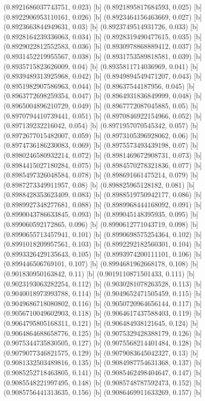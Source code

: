 {{{(0.8921686037743751, 0.023) [b] 
(0.8921895817684593, 0.025) [b] 
(0.8922906953110161, 0.026) [b] 
(0.8923464156463669, 0.027) [b] 
(0.8923663844949631, 0.03) [b] 
(0.8923749514931726, 0.033) [b] 
(0.8928164239336063, 0.034) [b] 
(0.8928319490477615, 0.035) [b] 
(0.8929022812552583, 0.036) [b] 
(0.8930978868889412, 0.037) [b] 
(0.8931452219955567, 0.038) [b] 
(0.8931753589818581, 0.039) [b] 
(0.8935715823626009, 0.04) [b] 
(0.8935811714036969, 0.041) [b] 
(0.8939489313925968, 0.042) [b] 
(0.8949894549471207, 0.043) [b] 
(0.8951982907586963, 0.044) [b] 
(0.89637544187956, 0.045) [b] 
(0.8963772698259354, 0.047) [b] 
(0.8964931836849999, 0.048) [b] 
(0.8965004896210729, 0.049) [b] 
(0.8967772087045885, 0.05) [b] 
(0.8970794410739441, 0.051) [b] 
(0.8970846922154966, 0.052) [b] 
(0.897139232216042, 0.054) [b] 
(0.8971957070545342, 0.057) [b] 
(0.8972677015482007, 0.059) [b] 
(0.8973105396928062, 0.06) [b] 
(0.8974736186230083, 0.069) [b] 
(0.8975573493439198, 0.07) [b] 
(0.8980246580932214, 0.072) [b] 
(0.8981469672908731, 0.073) [b] 
(0.8984415027180284, 0.075) [b] 
(0.8984570278321836, 0.077) [b] 
(0.8985497326048584, 0.078) [b] 
(0.898691661475214, 0.079) [b] 
(0.8987273349911957, 0.08) [b] 
(0.898825965128182, 0.081) [b] 
(0.8988428353623409, 0.083) [b] 
(0.8988519750942177, 0.086) [b] 
(0.8989927348277681, 0.088) [b] 
(0.8989968444168092, 0.091) [b] 
(0.8990043786633845, 0.093) [b] 
(0.899045148395935, 0.095) [b] 
(0.899060592172865, 0.096) [b] 
(0.8990612771043719, 0.098) [b] 
(0.8990655713457941, 0.101) [b] 
(0.8990698575254364, 0.102) [b] 
(0.8991018209957561, 0.103) [b] 
(0.8992292182560301, 0.104) [b] 
(0.8993326429135643, 0.105) [b] 
(0.8993974200111101, 0.106) [b] 
(0.899446506769101, 0.107) [b] 
(0.8994681962668178, 0.108) [b] 
(0.901830950163842, 0.11) [b] 
(0.9019110871501433, 0.111) [b] 
(0.9023193063282254, 0.112) [b] 
(0.9030281078263528, 0.113) [b] 
(0.9040018973993788, 0.114) [b] 
(0.9049652471505459, 0.115) [b] 
(0.9049686718080802, 0.116) [b] 
(0.9050720964656144, 0.117) [b] 
(0.9056710049602903, 0.118) [b] 
(0.9064617437588403, 0.119) [b] 
(0.9064795805168311, 0.121) [b] 
(0.906484938121645, 0.124) [b] 
(0.9064864688658776, 0.125) [b] 
(0.9075329428388179, 0.126) [b] 
(0.9075344735830505, 0.127) [b] 
(0.9075568214401484, 0.128) [b] 
(0.9079077346821575, 0.129) [b] 
(0.9079083645042327, 0.13) [b] 
(0.9081332503489816, 0.135) [b] 
(0.9084987754631368, 0.137) [b] 
(0.9085252718463805, 0.141) [b] 
(0.9085462498404647, 0.147) [b] 
(0.9085548221997495, 0.148) [b] 
(0.9085748787592473, 0.152) [b] 
(0.9085756441313635, 0.156) [b] 
(0.9086469911633269, 0.157) [b] 
}}}
